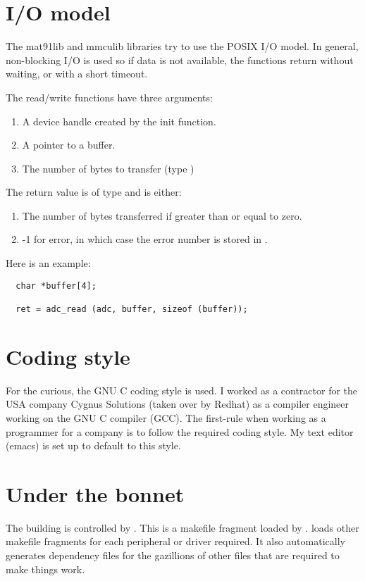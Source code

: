 \section{I/O model}


The mat91lib and mmculib libraries try to use the POSIX I/O model.  In
general, non-blocking I/O is used so if data is not available, the
functions return without waiting, or with a short timeout.

The read/write functions have three arguments:
%
\begin{enumerate}
\item A device handle created by the init function.
\item A pointer to a buffer.
\item The number of bytes to transfer (type )
\end{enumerate}
%
The return value is of type  and is either:
%
\begin{enumerate}
\item The number of bytes transferred if greater than or equal to zero.
\item -1 for error, in which case the error number is stored in .
\end{enumerate}

Here is an example:

\begin{verbatim}
  char *buffer[4];
  
  ret = adc_read (adc, buffer, sizeof (buffer));
\end{verbatim}


\section{Coding style}

For the curious, the GNU C coding style is used.  I worked as a
contractor for the USA company Cygnus Solutions (taken over by Redhat)
as a compiler engineer working on the GNU C compiler (GCC).  The
first-rule when working as a programmer for a company is to follow the
required coding style.  My text editor (emacs) is set up to default to
this style.


\section{Under the bonnet}

The building is controlled by . This is a
makefile fragment loaded by .
 loads other makefile
fragments for each peripheral or driver required. It also
automatically generates dependency files for the gazillions of other
files that are required to make things work.


